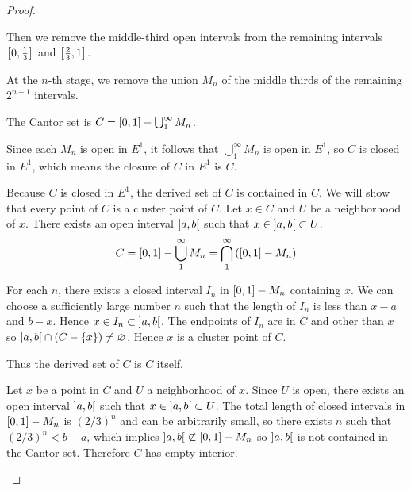 \begin{proof}
\begin{enumerate}[label={(\alph*)},itemsep=0pt]
              Then we remove the middle-third open intervals from the remaining intervals \( \left[{0, \frac{1}{3}}\right] \) and \( \left[{\frac{2}{3}, 1}\right] \).

              At the \( n \)-th stage, we remove the union \( M_{n} \) of the middle thirds of the remaining \( 2^{n-1} \) intervals.

              The Cantor set is \( C = \left[{0, 1}\right] - \bigcup^{\infty}_{1} M_{n} \).

              Since each \( M_{n} \) is open in \( E^{1} \), it follows that \( \bigcup^{\infty}_{1} M_{n} \) is open in \( E^{1} \), so \( C \) is closed in \( E^{1} \), which means the closure of \( C \) in \( E^{1} \) is \( C \).

              Because \( C \) is closed in \( E^{1} \), the derived set of \( C \) is contained in \( C \). We will show that every point of \( C \) is a cluster point of \( C \). Let \( x \in C \) and \( U \) be a neighborhood of \(x\). There exists an open interval \( \left]{a, b}\right[ \) such that \( x \in \left]{a, b}\right[ \subset U \).
              \[ C = \left[{0, 1}\right] - \bigcup^{\infty}_{1} M_{n} = \bigcap^{\infty}_{1}\left( \left[{0, 1}\right] - M_{n} \right) \]

              For each \( n \), there exists a closed interval \( I_{n} \) in \( \left[{0, 1}\right] - M_{n} \) containing \( x \). We can choose a sufficiently large number \( n \) such that the length of \( I_{n} \) is less than \( x - a \) and \( b - x \). Hence \( x \in I_{n} \subset \left]{a, b}\right[ \). The endpoints of \( I_{n} \) are in \( C \) and other than \( x \) so \( \left]{a, b}\right[ \cap (C - \left\{x\right\}) \ne \varnothing \). Hence \( x \) is a cluster point of \( C \).

              Thus the derived set of \( C \) is \( C \) itself.

              Let \( x \) be a point in \( C \) and \( U \) a neighborhood of \( x \). Since \( U \) is open, there exists an open interval \( \left]{a, b}\right[ \) such that \( x \in \left]{a, b}\right[ \subset U \). The total length of closed intervals in \( \left[{0, 1}\right] - M_{n} \) is \( {(2/3)}^{n} \) and can be arbitrarily small, so there exists \( n \) such that \( {(2/3)}^{n} < b - a \), which implies \( \left]{a, b}\right[ \not\subset \left[{0, 1}\right] - M_{n} \) so \( \left]{a, b}\right[ \) is not contained in the Cantor set. Therefore \( C \) has empty interior.


\end{enumerate}
\end{proof}
